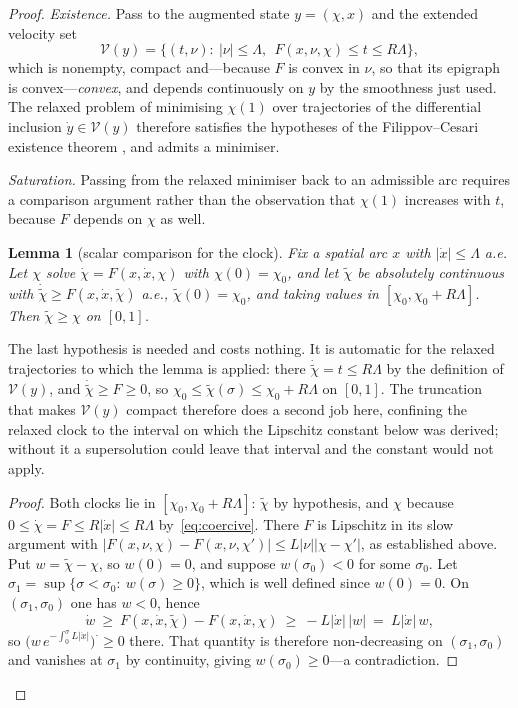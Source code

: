 \documentclass[12pt]{iopart}
\theoremstyle{plain}
\theoremstyle{definition}
\theoremstyle{plain}
\newtheorem{auxlemma}{Lemma}
\theoremstyle{remark}
\begin{document}
\begin{proof}
\emph{Existence.} Pass to the augmented state $y=(\chi,x)$ and the extended velocity set
\[
   \mathcal V(y)=\big\{(t,\nu):\ |\nu|\le\Lambda,\ \ F(x,\nu,\chi)\le t\le R\Lambda\big\},
\]
which is nonempty, compact and---because $F$ is convex in $\nu$, so that its epigraph is
convex---\emph{convex}, and depends continuously on $y$ by the smoothness just used. The
relaxed problem of minimising $\chi(1)$ over trajectories of the differential inclusion
$\dot y\in\mathcal V(y)$ therefore satisfies the hypotheses of the Filippov--Cesari
existence theorem \cite{Cesari1983,Filippov1962}, and admits a minimiser.

\emph{Saturation.} Passing from the relaxed minimiser back to an admissible arc
requires a comparison argument rather than the observation that $\chi(1)$ increases
with $t$, because $F$ depends on $\chi$ as well.

\begin{auxlemma}[scalar comparison for the clock]\label{lem:comparison}
Fix a spatial arc $x$ with $|\dot x|\le\Lambda$ a.e. Let $\chi$ solve
$\dot\chi=F(x,\dot x,\chi)$ with $\chi(0)=\chi_0$, and let $\tilde\chi$ be
absolutely continuous with $\dot{\tilde\chi}\ge F(x,\dot x,\tilde\chi)$ a.e.,
$\tilde\chi(0)=\chi_0$, and \emph{taking values in} $[\chi_0,\chi_0+R\Lambda]$.
Then $\tilde\chi\ge\chi$ on $[0,1]$.
\end{auxlemma}

The last hypothesis is needed and costs nothing. It is automatic for the relaxed
trajectories to which the lemma is applied: there $\dot{\tilde\chi}=t\le R\Lambda$ by
the definition of $\mathcal V(y)$, and $\dot{\tilde\chi}\ge F\ge0$, so
$\chi_0\le\tilde\chi(\sigma)\le\chi_0+R\Lambda$ on $[0,1]$. The truncation that
makes $\mathcal V(y)$ compact therefore does a second job here, confining the relaxed
clock to the interval on which the Lipschitz constant below was derived; without it a
supersolution could leave that interval and the constant would not apply.

\begin{proof}
Both clocks lie in $[\chi_0,\chi_0+R\Lambda]$: $\tilde\chi$ by hypothesis, and $\chi$ because
$0\le\dot\chi=F\le R|\dot x|\le R\Lambda$ by~\eqref{eq:coercive}. There $F$ is Lipschitz in its slow
argument with $|F(x,\nu,\chi)-F(x,\nu,\chi')|\le L|\nu||\chi-\chi'|$, as established
above. Put $w=\tilde\chi-\chi$, so $w(0)=0$, and suppose $w(\sigma_0)<0$ for some
$\sigma_0$. Let $\sigma_1=\sup\{\sigma<\sigma_0:\ w(\sigma)\ge0\}$, which is well
defined since $w(0)=0$. On $(\sigma_1,\sigma_0)$ one has $w<0$, hence
\[
   \dot w\ \ge\ F(x,\dot x,\tilde\chi)-F(x,\dot x,\chi)\ \ge\ -L|\dot x|\,|w|
       \ =\ L|\dot x|\,w ,
\]
so $\big(w\,e^{-\int_0^\sigma L|\dot x|}\big)^{\!\textstyle\cdot}\ge0$ there. That
quantity is therefore non-decreasing on $(\sigma_1,\sigma_0)$ and vanishes at
$\sigma_1$ by continuity, giving $w(\sigma_0)\ge0$---a contradiction.
\end{proof}


\end{proof}
\end{document}
